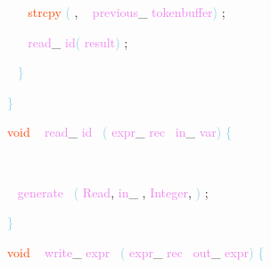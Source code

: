 \documentclass[8, usernames, dvipsnames]{beamer}
\begin{document}
\begin{frame}
 \textcolor{White}{\   }
\textcolor{White}{\   }
\textcolor{OrangeRed}{strcpy}
\textcolor{SkyBlue}{(}
\textcolor{Sepia}{,}
\textcolor{White}{\ }
\textcolor{Violet}{previous}\textcolor{Sepia}{\_}
\textcolor{Violet}{tokenbuffer}\textcolor{SkyBlue}{)}
\textcolor{Sepia}{;}

 \textcolor{White}{\   }
\textcolor{White}{\   }
\textcolor{Violet}{read}\textcolor{Sepia}{\_}
\textcolor{Violet}{id}\textcolor{SkyBlue}{(}
\textcolor{Violet}{result}\textcolor{SkyBlue}{)}
\textcolor{Sepia}{;}

 \end{frame}
\begin{frame}
\textcolor{White}{\   }
\textcolor{SkyBlue}{\} }

 \textcolor{SkyBlue}{\} }

 
 \textcolor{OrangeRed}{void}
\textcolor{White}{\ }
\textcolor{Violet}{read}\textcolor{Sepia}{\_}
\textcolor{Violet}{id}\textcolor{White}{\ }
\textcolor{SkyBlue}{(}
\textcolor{Violet}{expr}\textcolor{Sepia}{\_}
\textcolor{Violet}{rec}\textcolor{White}{\ }
\textcolor{Violet}{in}\textcolor{Sepia}{\_}
\textcolor{Violet}{var}\textcolor{SkyBlue}{)}
\textcolor{SkyBlue}{\{ }

 \textcolor{White}{\ }

 \textcolor{White}{\ }
\textcolor{Violet}{generate}\textcolor{White}{\ }
\textcolor{SkyBlue}{(}
\textcolor{Violet}{Read}\textcolor{Sepia}{,}
\textcolor{Violet}{in}\textcolor{Sepia}{\_}
\textcolor{Sepia}{,}
\textcolor{Violet}{Integer}\textcolor{Sepia}{,}
\textcolor{SkyBlue}{)}
\textcolor{Sepia}{;}

 
 \textcolor{SkyBlue}{\} }

 \textcolor{OrangeRed}{void}
\textcolor{White}{\ }
\textcolor{Violet}{write}\textcolor{Sepia}{\_}
\textcolor{Violet}{expr}\textcolor{White}{\ }
\textcolor{SkyBlue}{(}
\textcolor{Violet}{expr}\textcolor{Sepia}{\_}
\textcolor{Violet}{rec}\textcolor{White}{\ }
\textcolor{Violet}{out}\textcolor{Sepia}{\_}
\textcolor{Violet}{expr}\textcolor{SkyBlue}{)}
\textcolor{SkyBlue}{\{ }

 
 \end{frame}
\end{document}
